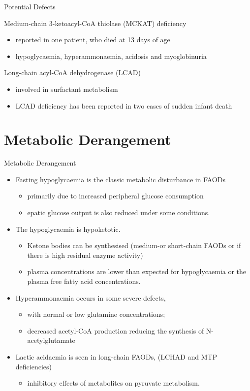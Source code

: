 \documentclass[presentation, smaller]{beamer}
\begin{document}
\begin{frame}[label={sec:orgheadline44}]{Potential Defects}
\begin{block}{Medium-chain 3-ketoacyl-CoA thiolase (MCKAT) deficiency}
\begin{itemize}
\item reported in one patient, who died at 13 days of age
\item hypoglycaemia, hyperammonaemia, acidosis and myoglobinuria
\end{itemize}
\end{block}

\begin{block}{Long-chain acyl-CoA dehydrogenase (LCAD)}
\begin{itemize}
\item involved in surfactant metabolism
\item LCAD deficiency has been reported in two cases of sudden infant death
\end{itemize}
\end{block}
\end{frame}


\section{Metabolic Derangement}
\label{sec:orgheadline48}
\begin{frame}[label={sec:orgheadline46}]{Metabolic Derangement}
\begin{itemize}
\item Fasting hypoglycaemia is the classic metabolic disturbance in FAODs
\begin{itemize}
\item primarily due to increased peripheral glucose consumption
\item epatic glucose output is also reduced under some conditions.
\end{itemize}
\item The hypoglycaemia is hypoketotic.
\begin{itemize}
\item Ketone bodies can be synthesised (medium-or short-chain FAODs or if there is high residual enzyme activity)
\item plasma concentrations are lower than expected for hypoglycaemia or the plasma free fatty acid concentrations.
\end{itemize}
\item Hyperammonaemia occurs in some severe defects,
\begin{itemize}
\item with normal or low glutamine concentrations;
\item decreased acetyl-CoA production reducing the synthesis of N-acetylglutamate
\end{itemize}
\item Lactic acidaemia is seen in long-chain FAODs, (LCHAD and MTP deficiencies)
\begin{itemize}
\item inhibitory effects of metabolites on pyruvate metabolism.
\end{itemize}
\end{itemize}
\end{frame}
\end{document}
